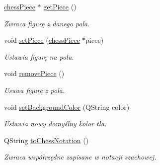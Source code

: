 \begin{DoxyCompactItemize}
\mbox{\label{classchess_square_a2fee406370161f95d9a4ff9b0e82c436}} 
\hyperlink{classchess_piece}{chess\+Piece} $\ast$ \hyperlink{classchess_square_a2fee406370161f95d9a4ff9b0e82c436}{get\+Piece} ()
\begin{DoxyCompactList}\small\item\em Zwraca figurę z danego pola. \end{DoxyCompactList}\item 
\mbox{\label{classchess_square_aa7cbc607deb4a7e4844553e3c74076a1}} 
void \hyperlink{classchess_square_aa7cbc607deb4a7e4844553e3c74076a1}{set\+Piece} (\hyperlink{classchess_piece}{chess\+Piece} $\ast$piece)
\begin{DoxyCompactList}\small\item\em Ustawia figurę na polu. \end{DoxyCompactList}\item 
\mbox{\label{classchess_square_ace9bb5543d5e8a2354a979bd7dc95c5c}} 
void \hyperlink{classchess_square_ace9bb5543d5e8a2354a979bd7dc95c5c}{remove\+Piece} ()
\begin{DoxyCompactList}\small\item\em Usuwa figurę z pola. \end{DoxyCompactList}\item 
\mbox{\label{classchess_square_a2834d87001da98346f34e72168b70ea7}} 
void \hyperlink{classchess_square_a2834d87001da98346f34e72168b70ea7}{set\+Background\+Color} (Q\+String color)
\begin{DoxyCompactList}\small\item\em Ustawia nowy domyślny kolor tła. \end{DoxyCompactList}\item 
\mbox{\label{classchess_square_a370b3b5cffd0d7fa91ac23f107e062e5}} 
Q\+String \hyperlink{classchess_square_a370b3b5cffd0d7fa91ac23f107e062e5}{to\+Chess\+Notation} ()
\begin{DoxyCompactList}\small\item\em Zwraca współrzędne zapisane w notacji szachowej. \end{DoxyCompactList}\end{DoxyCompactItemize}
